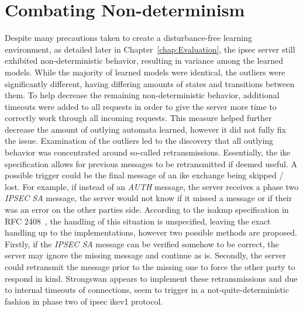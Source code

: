 \section{Combating Non-determinism} \label{sec:nondet}
Despite many precautions taken to create a disturbance-free learning environment, as detailed later in Chapter~\ref{chap:Evaluation}, the \ac{ipsec} server still exhibited non-deterministic behavior, resulting in variance among the learned models. While the majority of learned models were identical, the outliers were significantly different, having differing amounts of states and transitions between them. To help decrease the remaining non-deterministic behavior, additional timeouts were added to all requests in order to give the server more time to correctly work through all incoming requests. This measure helped further decrease the amount of outlying automata learned, however it did not fully fix the issue. Examination of the outliers led to the discovery that all outlying behavior was concentrated around so-called retransmissions. Essentially, the \ac{ike} specification allows for previous messages to be retransmitted if deemed useful. A possible trigger could be the final message of an \ac{ike} exchange being skipped / lost. For example, if instead of an \emph{AUTH} message, the server receives a phase two \emph{IPSEC SA} message, the server would not know if it missed a message or if their was an error on the other parties side. According to the \ac{isakmp} specification in RFC 2408~\cite{rfc:isakmp}, the handling of this situation is unspecified, leaving the exact handling up to the implementations, however two possible methods are proposed. Firstly, if the \emph{IPSEC SA} message can be verified somehow to be correct, the server may ignore the missing message and continue as is. Secondly, the server could retransmit the message prior to the missing one to force the other party to respond in kind. Strongswan appears to implement these retransmissions and due to internal timeouts of connections, seem to trigger in a not-quite-deterministic fashion in phase two of \ac{ipsec} \ac{ike}v1 protocol.

